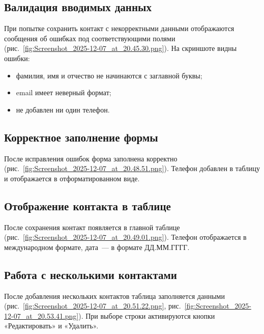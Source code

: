 
\subsection{Валидация вводимых данных}

При попытке сохранить контакт с некорректными данными отображаются сообщения об ошибках под соответствующими полями (рис.~\ref{fig:Screenshot_2025-12-07_at_20.45.30.png}). На скриншоте видны ошибки:
\begin{itemize}
    \item фамилия, имя и отчество не начинаются с заглавной буквы;
    \item email имеет неверный формат;
    \item не добавлен ни один телефон.
\end{itemize}


\subsection{Корректное заполнение формы}

После исправления ошибок форма заполнена корректно (рис.~\ref{fig:Screenshot_2025-12-07_at_20.48.51.png}). Телефон добавлен в таблицу и отображается в отформатированном виде.


\subsection{Отображение контакта в таблице}

После сохранения контакт появляется в главной таблице (рис.~\ref{fig:Screenshot_2025-12-07_at_20.49.01.png}). Телефон отображается в международном формате, дата~--- в формате ДД.ММ.ГГГГ.


\subsection{Работа с несколькими контактами}

После добавления нескольких контактов таблица заполняется данными (рис.~\ref{fig:Screenshot_2025-12-07_at_20.51.22.png}, рис.~\ref{fig:Screenshot_2025-12-07_at_20.53.41.png}). При выборе строки активируются кнопки «Редактировать» и «Удалить».


